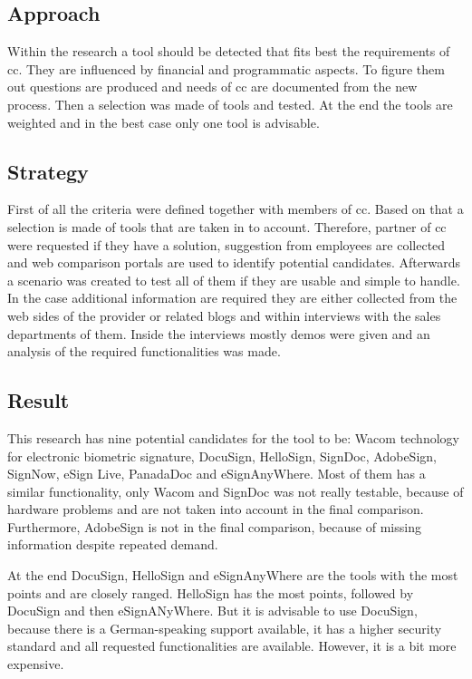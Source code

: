 \subsection{Approach}
Within the research a tool should be detected that fits best the requirements of \gls{cc}. They are influenced by financial and programmatic aspects. To figure them out questions are produced and needs of \gls{cc} are documented from the new process. Then a selection was made of tools and tested. At the end the tools are weighted and in the best case only one tool is advisable.   


\subsection{Strategy}
First of all the criteria were defined together with members of \gls{cc}. Based on that a selection is made of tools that are taken in to account. Therefore, partner of \gls{cc} were requested if they have a solution, suggestion from employees are collected and web comparison portals are used to identify potential candidates. Afterwards a scenario was created to test all of them if they are usable and simple to handle. In the case additional information are required they are either collected from the web sides of the provider or related blogs and within interviews with the sales departments of them. Inside the interviews mostly demos were given and an analysis of the required functionalities was made.  

\subsection{Result}
This research has nine potential candidates for the tool to be: Wacom technology for electronic biometric signature, DocuSign, HelloSign, SignDoc, AdobeSign, SignNow, eSign Live, PanadaDoc and eSignAnyWhere. Most of them has a similar functionality, only Wacom and SignDoc was not really testable, because of hardware problems and are not taken into account in the final comparison. Furthermore, AdobeSign is not in the final comparison, because of missing information despite repeated demand.

At the end DocuSign, HelloSign and eSignAnyWhere are the tools with the most points and are closely ranged. HelloSign has the most points, followed by DocuSign and then eSignANyWhere. But it is advisable to use DocuSign, because there is a German-speaking support available, it has a higher security standard and all requested functionalities are available. However, it is a bit more expensive.  

